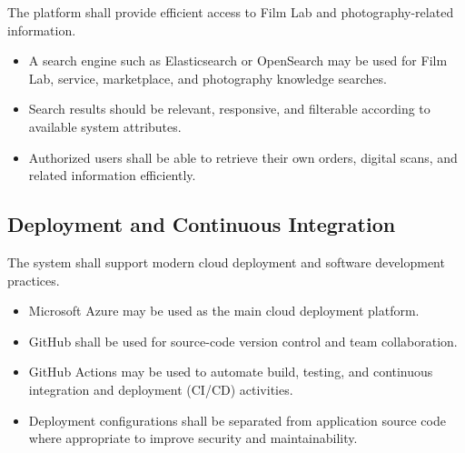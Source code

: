 The platform shall provide efficient access to Film Lab and
photography-related information.

\begin{itemize}
    \item A search engine such as Elasticsearch or OpenSearch may be used
    for Film Lab, service, marketplace, and photography knowledge searches.

    \item Search results should be relevant, responsive, and filterable
    according to available system attributes.

    \item Authorized users shall be able to retrieve their own orders,
    digital scans, and related information efficiently.
\end{itemize}

\subsection{Deployment and Continuous Integration}

The system shall support modern cloud deployment and software development
practices.

\begin{itemize}
    \item Microsoft Azure may be used as the main cloud deployment platform.

    \item GitHub shall be used for source-code version control and
    team collaboration.

    \item GitHub Actions may be used to automate build, testing, and
    continuous integration and deployment (CI/CD) activities.

    \item Deployment configurations shall be separated from application
    source code where appropriate to improve security and maintainability.
\end{itemize}
